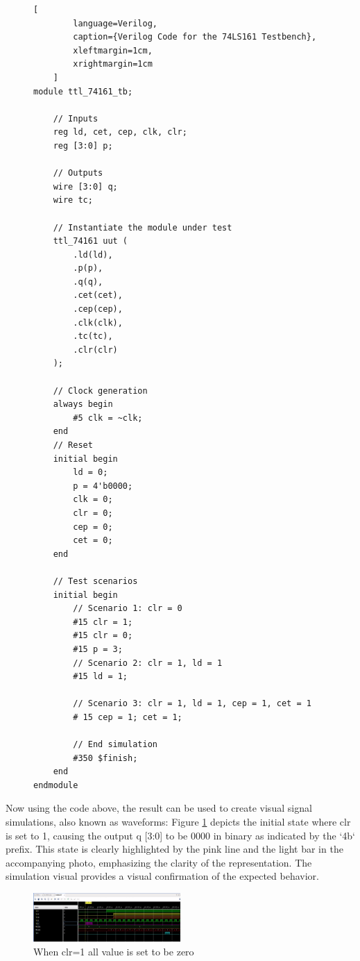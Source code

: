 \documentclass[conference]{IEEEtran}
\begin{document}
\begin{figure}[h]
    \centering
    \begin{lstlisting}[
        language=Verilog,
        caption={Verilog Code for the 74LS161 Testbench},
        xleftmargin=1cm,
        xrightmargin=1cm
    ]      
module ttl_74161_tb;

    // Inputs
    reg ld, cet, cep, clk, clr;
    reg [3:0] p;

    // Outputs
    wire [3:0] q;
    wire tc;

    // Instantiate the module under test
    ttl_74161 uut (
        .ld(ld),
        .p(p),
        .q(q),
        .cet(cet),
        .cep(cep),
        .clk(clk),
        .tc(tc),
        .clr(clr)
    );

    // Clock generation
    always begin
        #5 clk = ~clk;
    end
    // Reset
    initial begin
        ld = 0;
        p = 4'b0000;
        clk = 0;
        clr = 0;
        cep = 0;
        cet = 0;
    end
    
    // Test scenarios
    initial begin
        // Scenario 1: clr = 0
        #15 clr = 1;
        #15 clr = 0;
        #15 p = 3;
        // Scenario 2: clr = 1, ld = 1
        #15 ld = 1;

        // Scenario 3: clr = 1, ld = 1, cep = 1, cet = 1
        # 15 cep = 1; cet = 1;

        // End simulation
        #350 $finish;
    end
endmodule
    \end{lstlisting}
\end{figure}

Now using the code above, the result can be used to create visual signal simulations, also known as waveforms: Figure \ref{fig:initial_state} depicts the initial state where clr is set to 1, causing the output q [3:0] to be 0000 in binary as indicated by the `4b` prefix. This state is clearly highlighted by the pink line and the light bar in the accompanying photo, emphasizing the clarity of the representation. The simulation visual provides a visual confirmation of the expected behavior.

\begin{figure}[h]
    \centering
    \includegraphics[width=0.5\textwidth]{verilog_simulation_1}
    \caption{When clr=1 all value is set to be zero}
    \label{fig:initial_state}
\end{figure}
\end{document}
